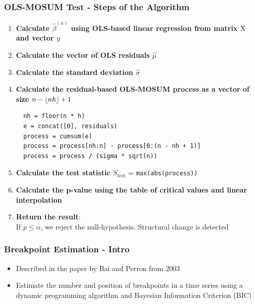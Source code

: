 \documentclass[9pt]{beamer}
\DeclarePairedDelimiter\floor{\lfloor}{\rfloor}
\begin{document}
\begin{frame}[fragile]
  \frametitle{OLS-MOSUM Test - Steps of the Algorithm}
  \begin{enumerate}
  \item \textbf{Calculate $\hat{\beta}^{(n)}$ using OLS-based linear
    regression from matrix $\mathrm{X}$ and vector $y$}
  \item \textbf{Calculate the vector of OLS residuals $\hat{\mu}$}
  \item \textbf{Calculate the standard deviation $\hat{\sigma}$}
  \item \textbf{Calculate the residual-based OLS-MOSUM process as a vector of size $n - \floor{nh} + 1$}
  \begin{verbatim}
  nh = floor(n * h)
  e = concat([0], residuals)
  process = cumsum(e)
  process = process[nh:n] - process[0:(n - nh + 1)]
  process = process / (sigma * sqrt(n))
  \end{verbatim}
\item \textbf{Calculate the test statistic $S_{\text{test}}$} = \texttt{max(abs(process))}
\item \textbf{Calculate the p-value using the table of critical values and linear interpolation}
\item \textbf{Return the result}: \\
  If $p \leq \alpha$, we reject the null-hypothesis. Structural change is detected
  \end{enumerate} 
\end{frame}

\begin{frame}
\frametitle{Breakpoint Estimation - Intro}
\begin{itemize}
  \item Described in the paper by Bai and Perron from 2003
  \item Estimate the number and position of breakpoints in a time series using
    a dynamic programming algorithm and Bayesian Information Criterion (BIC)
\end{itemize}
\end{frame}
\end{document}
